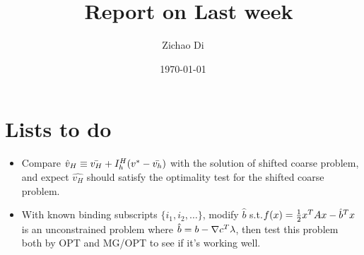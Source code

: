\documentclass[10pt]{article}
\title{\ Report on Last week}
\author{Zichao Di}
\date{\today}
\begin{document}
  \maketitle 

\section {Lists to do}
\begin{itemize}
\item  {Compare  $\hat v_{H} \equiv \bar{v_{H}}+I_h^H(v^{*}-\bar{v_{h}})$ with the solution of shifted coarse problem, and expect $\hat{v_{H}}$ should satisfy the optimality test for the                                  shifted coarse problem.}

\item With known binding subscripts $\{i_{1},i_{2},\dots\}$, modify $\hat{b}$ s.t.$f(x)=\frac{1}{2}  x^T Ax-\hat{b}^T x$  is an unconstrained problem where $\hat{b}=b-\nabla c^T \lambda$, then  test this problem both by OPT and MG/OPT to see if it's working well.

\end{itemize}
\end{document}
